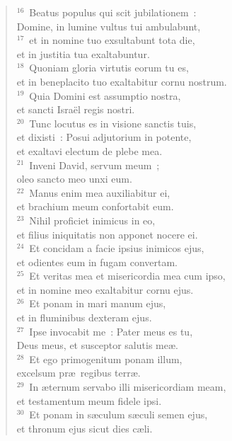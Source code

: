 \begin{verse}
${}^{16}$~Beatus populus qui scit jubilationem~:\\ Domine, in lumine vultus tui ambulabunt,\\
${}^{17}$~et in nomine tuo exsultabunt tota die,\\ et in justitia tua exaltabuntur.\\
${}^{18}$~Quoniam gloria virtutis eorum tu es,\\ et in beneplacito tuo exaltabitur cornu nostrum.\\
${}^{19}$~Quia Domini est assumptio nostra,\\ et sancti Isra\"el regis nostri.\\
${}^{20}$~Tunc locutus es in visione sanctis tuis,\\ et dixisti~: Posui adjutorium in potente,\\ et exaltavi electum de plebe mea.\\
${}^{21}$~Inveni David, servum meum~;\\ oleo sancto meo unxi eum.\\
${}^{22}$~Manus enim mea auxiliabitur ei,\\ et brachium meum confortabit eum.\\
${}^{23}$~Nihil proficiet inimicus in eo,\\ et filius iniquitatis non apponet nocere ei.\\
${}^{24}$~Et concidam a facie ipsius inimicos ejus,\\ et odientes eum in fugam convertam.\\
${}^{25}$~Et veritas mea et misericordia mea cum ipso,\\ et in nomine meo exaltabitur cornu ejus.\\
${}^{26}$~Et ponam in mari manum ejus,\\ et in fluminibus dexteram ejus.\\
${}^{27}$~Ipse invocabit me~: Pater meus es tu,\\ Deus meus, et susceptor salutis me\ae .\\
${}^{28}$~Et ego primogenitum ponam illum,\\ excelsum pr\ae\ regibus terr\ae .\\
${}^{29}$~In \ae ternum servabo illi misericordiam meam,\\ et testamentum meum fidele ipsi.\\
${}^{30}$~Et ponam in s\ae culum s\ae culi semen ejus,\\ et thronum ejus sicut dies c\ae li.\\

\end{verse}
